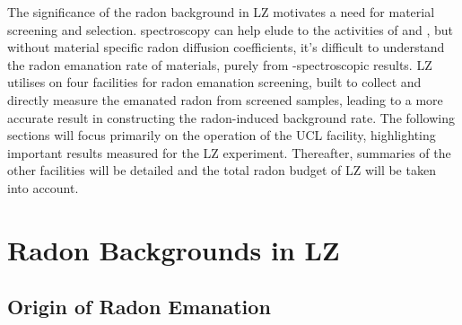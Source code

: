 The significance of the radon background in LZ motivates a need for material screening and selection. \gray spectroscopy can help elude to the activities of \UandTe{} and \UandTl{}, but without material specific radon diffusion coefficients, it's difficult to understand the radon emanation rate of materials, purely from \gamma-spectroscopic results. LZ utilises on four facilities for radon emanation screening, built to collect and directly measure the emanated radon from screened samples, leading to a more accurate result in constructing the radon-induced background rate. The following sections will focus primarily on the operation of the UCL facility, highlighting important results measured for the LZ experiment. Thereafter, summaries of the other facilities will be detailed and the total radon budget of LZ will be taken into account. 

\section{Radon Backgrounds in LZ}
\label{sec:radon_and_lz}

\subsection{Origin of Radon Emanation}
\label{secsec:radon_origins}

